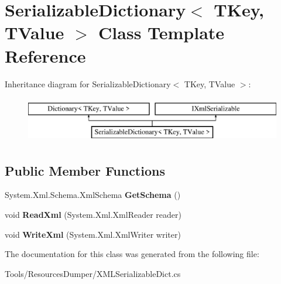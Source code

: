\hypertarget{class_serializable_dictionary_3_01_t_key_00_01_t_value_01_4}{\section{Serializable\-Dictionary$<$ T\-Key, T\-Value $>$ Class Template Reference}
\label{class_serializable_dictionary_3_01_t_key_00_01_t_value_01_4}
}
Inheritance diagram for Serializable\-Dictionary$<$ T\-Key, T\-Value $>$\-:\begin{figure}[H]
\begin{center}
\leavevmode
\includegraphics[height=2.000000cm]{class_serializable_dictionary_3_01_t_key_00_01_t_value_01_4}
\end{center}
\end{figure}
\subsection*{Public Member Functions}
\begin{DoxyCompactItemize}
\item 
\hypertarget{class_serializable_dictionary_3_01_t_key_00_01_t_value_01_4_a5f2b977cf2856628022181a123023ef3}{System.\-Xml.\-Schema.\-Xml\-Schema {\bfseries Get\-Schema} ()}\label{class_serializable_dictionary_3_01_t_key_00_01_t_value_01_4_a5f2b977cf2856628022181a123023ef3}

\item 
\hypertarget{class_serializable_dictionary_3_01_t_key_00_01_t_value_01_4_a0a8bd48019ddac457123af030e63322a}{void {\bfseries Read\-Xml} (System.\-Xml.\-Xml\-Reader reader)}\label{class_serializable_dictionary_3_01_t_key_00_01_t_value_01_4_a0a8bd48019ddac457123af030e63322a}

\item 
\hypertarget{class_serializable_dictionary_3_01_t_key_00_01_t_value_01_4_a939a3fe92e83a048b55f9f0c545ebb92}{void {\bfseries Write\-Xml} (System.\-Xml.\-Xml\-Writer writer)}\label{class_serializable_dictionary_3_01_t_key_00_01_t_value_01_4_a939a3fe92e83a048b55f9f0c545ebb92}

\end{DoxyCompactItemize}


The documentation for this class was generated from the following file\-:\begin{DoxyCompactItemize}
\item 
Tools/\-Resources\-Dumper/X\-M\-L\-Serializable\-Dict.\-cs\end{DoxyCompactItemize}
